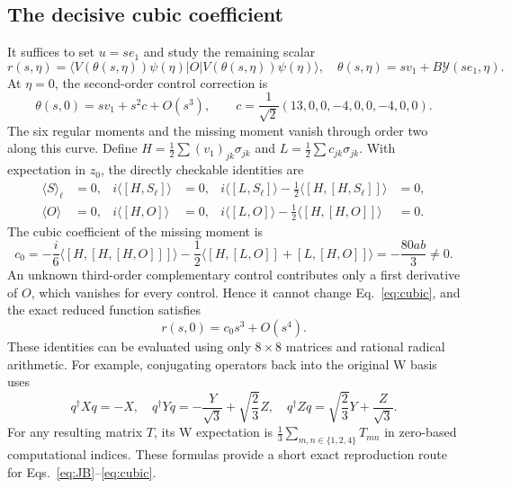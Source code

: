 \documentclass[11pt]{article}
\newcommand{\ket}[1]{\lvert #1\rangle}
\newcommand{\bra}[1]{\langle #1\rvert}
\newcommand{\av}[1]{\langle #1\rangle}
\begin{document}
\subsection{The decisive cubic coefficient}
It suffices to set $u=se_1$ and study the remaining scalar
\begin{equation}
r(s,\eta)=\bra{V(\theta(s,\eta))\psi(\eta)}O
\ket{V(\theta(s,\eta))\psi(\eta)},\quad
\theta(s,\eta)=s v_1+B\mathcal Y(se_1,\eta).
\end{equation}
At $\eta=0$, the second-order control correction is
\begin{equation}
\theta(s,0)=s v_1+s^2c+O(s^3),\qquad
c=\frac1{\sqrt2}(13,0,0,-4,0,0,-4,0,0).
\label{eq:c}
\end{equation}
The six regular moments and the missing moment vanish through order two along this curve. Define $H=\frac12\sum (v_1)_{jk}\sigma_{jk}$ and $L=\frac12\sum c_{jk}\sigma_{jk}$. With expectation in $z_0$, the directly checkable identities are
\begin{align}
\av S_\ell&=0,& i\av{[H,S_\ell]}&=0,&
i\av{[L,S_\ell]}-\tfrac12\av{[H,[H,S_\ell]]}&=0,\label{eq:jet}\\
\av O&=0,& i\av{[H,O]}&=0,&
i\av{[L,O]}-\tfrac12\av{[H,[H,O]]}&=0.\nonumber
\end{align}
The cubic coefficient of the missing moment is
\begin{equation}
c_0=-\frac i6\av{[H,[H,[H,O]]]}
-\frac12\av{[H,[L,O]]+[L,[H,O]]}
=-\frac{80ab}{3}\ne0.
\label{eq:cubic}
\end{equation}
An unknown third-order complementary control contributes only a first derivative of $O$, which vanishes for every control. Hence it cannot change Eq.~\eqref{eq:cubic}, and the exact reduced function satisfies
\begin{equation}
r(s,0)=c_0s^3+O(s^4).
\label{eq:reduced}
\end{equation}
These identities can be evaluated using only $8\times8$ matrices and rational radical arithmetic. For example, conjugating operators back into the original W basis uses
\begin{equation}
q^\dagger Xq=-X,\quad
q^\dagger Yq=-\frac{Y}{\sqrt3}+\sqrt{\frac23}Z,\quad
q^\dagger Zq=\sqrt{\frac23}Y+\frac{Z}{\sqrt3}.
\end{equation}
For any resulting matrix $T$, its W expectation is $\frac13\sum_{m,n\in\{1,2,4\}}T_{mn}$ in zero-based computational indices. These formulas provide a short exact reproduction route for Eqs.~\eqref{eq:JB}--\eqref{eq:cubic}.
\end{document}
